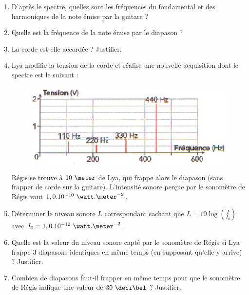 \begin{enumerate}
\item D'après le spectre, quelles sont les fréquences du fondamental et des harmoniques de la note émise par la guitare ?
\item Quelle est la fréquence de la note émise par le diapason ?
\item La corde est-elle accordée ? Justifier.
\item Lya modifie la tension de la corde et réalise une nouvelle acquisition dont le spectre est le suivant :

\begin{figure}[h]
\begin{center}
\includegraphics[width=0.5\columnwidth]{images/Exo2_Ondes_Oscillogramme2}
\end{center}
\end{figure}


\newpage

Régis se trouve à $10\text{ }\meter$ de Lya, qui frappe alors le diapason (sans frapper de corde sur la guitare). L'intensité sonore perçue par le sonomètre de Régis vaut $1,0 . 10^{-10}\text{ }\watt.\meter^{-2}$.

\item Déterminer le niveau sonore $L$ correspondant sachant que $L = 10 \log\left(\frac{I}{I_{0}}\right)$ avec $I_{0} = 1,0 . 10^{-12}\text{ }\watt.\meter^{-2}$.

\item Quelle est la valeur du niveau sonore capté par le sonomètre de Régis si Lya frappe $3$ diapasons identiques en même temps (en supposant qu'elle y arrive) ? Justifier.

\item Combien de diapasons faut-il frapper en même temps pour que le sonomètre de Régis indique une valeur de $30\text{ }\deci\bel$ ? Justifier.

\end{enumerate}

\vspace{0.3cm}

